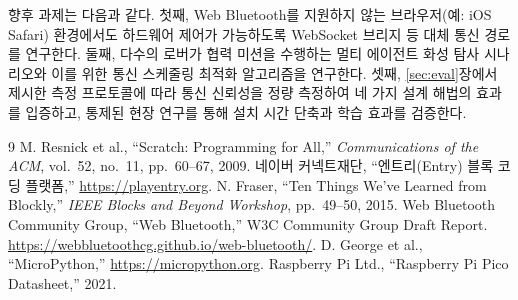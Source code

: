 \documentclass[10pt]{article}
\begin{document}
향후 과제는 다음과 같다. 첫째, Web Bluetooth를 지원하지 않는 브라우저(예: iOS
Safari) 환경에서도 하드웨어 제어가 가능하도록 WebSocket 브리지 등 대체 통신 경로를
연구한다. 둘째, 다수의 로버가 협력 미션을 수행하는 멀티 에이전트 화성 탐사 시나리오와
이를 위한 통신 스케줄링\,\textperiodcentered\,최적화 알고리즘을 연구한다. 셋째,
\ref{sec:eval}장에서 제시한 측정 프로토콜에 따라 통신 신뢰성을 정량 측정하여 네 가지
설계 해법의 효과를 입증하고, 통제된 현장 연구를 통해 설치 시간 단축과 학습 효과를
검증한다.

\begin{thebibliography}{9}
\small
 M. Resnick et al., ``Scratch: Programming for All,''
  \textit{Communications of the ACM}, vol.~52, no.~11, pp.~60--67, 2009.
 네이버 커넥트재단, ``엔트리(Entry) 블록 코딩 플랫폼,''
  \url{https://playentry.org}.
 N. Fraser, ``Ten Things We've Learned from Blockly,''
  \textit{IEEE Blocks and Beyond Workshop}, pp.~49--50, 2015.
 Web Bluetooth Community Group, ``Web Bluetooth,''
  W3C Community Group Draft Report. \url{https://webbluetoothcg.github.io/web-bluetooth/}.
 D. George et al., ``MicroPython,''
  \url{https://micropython.org}.
 Raspberry Pi Ltd., ``Raspberry Pi Pico Datasheet,'' 2021.
\end{thebibliography}
\end{document}
